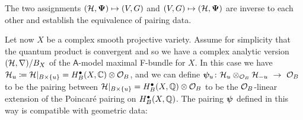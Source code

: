 \documentclass[twoside,leqno]{article}
\numberwithin{equation}{section}
\theoremstyle{plain}
\theoremstyle{definition}
\begin{document}
The two assignments $(\mathcal H,\boldsymbol{\Psi}) \mapsto (V,G)$ and $(V,G) \mapsto (\mathcal H,\boldsymbol{\Psi})$ are inverse to each other and 
establish the equivalence of pairing data. 

\medskip

Let now $X$ be a complex  smooth projective variety. Assume for simplicity that the quantum product is convergent and so we have a complex analytic version $(\mathcal H,\nabla)/B_{X}$ of the $\mathsf{A}$-model maximal F-bundle  for $X$. In this case we have $\mathcal H_{u} \coloneqq \mathcal H|_{B\times \{ u\}} = H^{\bullet}_{B}(X,\mathbb C)\otimes\mathcal O_{B}$, and 
we can define $\boldsymbol{\psi}_{u} \colon \mathcal H_{u}\otimes_{\mathcal O_{B}} \mathcal H_{-u}  \ \to \ \mathcal O_{B}$ to be the pairing between $\mathcal H|_{B\times\{u\}} = H^{\bullet}_{B}(X,\mathbb Q)\otimes \mathcal O_{B}$ to be the $\mathcal O_{B}$-linear extension of the Poincar\'{e} pairing on  $H^{\bullet}_{B}(X,\mathbb Q)$. The pairing $\boldsymbol{\psi}$ defined in this way is compatible with geometric data:
\end{document}
